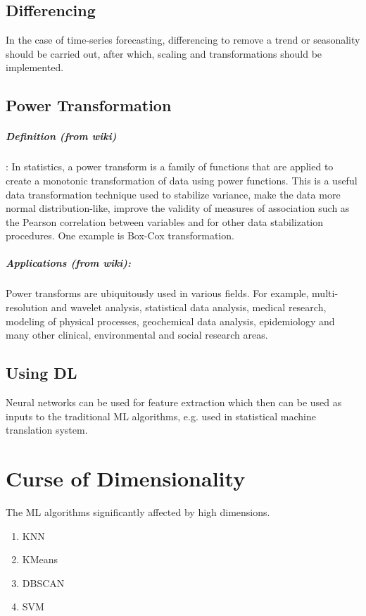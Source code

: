 \documentclass[a4paper, 12pt]{report}
\begin{document}
\section{Differencing}
In the case of time-series forecasting, differencing to remove a trend or seasonality should be carried out, after which, scaling and transformations should be implemented.
\section{Power Transformation}

\paragraph{Definition (from wiki)}: In statistics, a power transform is a family of functions that are applied to create a monotonic transformation of data using power functions. This is a useful data transformation technique used to stabilize variance, make the data more normal distribution-like, improve the validity of measures of association such as the Pearson correlation between variables and for other data stabilization procedures. One example is Box-Cox transformation.

\paragraph{Applications (from wiki):} Power transforms are ubiquitously used in various fields. For example, multi-resolution and wavelet analysis, statistical data analysis, medical research, modeling of physical processes, geochemical data analysis, epidemiology and many other clinical, environmental and social research areas.

\section{Using DL}
Neural networks can be used for feature extraction which then can be used as inputs to the traditional ML algorithms, e.g. used in statistical machine translation system.

\chapter{Curse of Dimensionality}
The ML algorithms significantly affected by high dimensions.

\begin{enumerate}
\item KNN
\item KMeans
\item DBSCAN
\item SVM
\end{enumerate}
\end{document}
